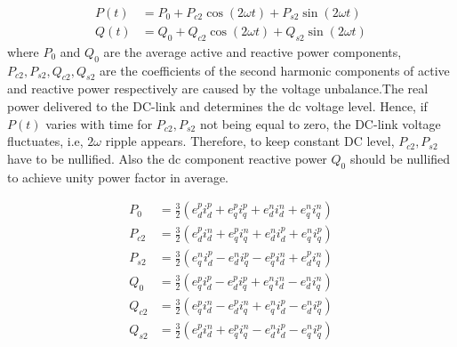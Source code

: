 \begin{equation}
    \begin{split}
        P(t) &= P_0 + P_{c2}\cos(2\omega t) + P_{s2}\sin(2\omega t) \\
        Q(t) &= Q_0 + Q_{c2}\cos(2\omega t) + Q_{s2}\sin(2\omega t)
    \end{split}
    \label{eq:instantaneous_power}
\end{equation}
where $P_0$ and $Q_0$ are the average active and reactive power components, $P_{c2}, P_{s2}, Q_{c2}, Q_{s2}$ are the coefficients of the
second harmonic components of active and reactive power respectively are caused by the voltage unbalance.The real power delivered to the
DC-link and determines the dc voltage level. Hence, if $P(t)$ varies with
time for $P_{c2}, P_{s2}$ not being equal to zero, the DC-link voltage fluctuates, i.e, $2\omega$ ripple appears. Therefore, to keep constant
DC level, $P_{c2}, P_{s2}$ have to be nullified. Also the dc component reactive power $Q_0$ should be nullified to achieve unity power
factor in average.\par
\begin{equation}
    \begin{split}
        P_0 &= \frac{3}{2}(e_{d}^{p} i_{d}^{p} + e_{q}^{p} i_{q}^{p} + e_{d}^{n} i_{d}^{n} + e_{q}^{n} i_{q}^{n}) \\
        P_{c2} &= \frac{3}{2}(e_{d}^{p} i_{d}^{n} + e_{q}^{p} i_{q}^{n} + e_{d}^{n} i_{d}^{p} + e_{q}^{n} i_{q}^{p}) \\
        P_{s2} &= \frac{3}{2}(e_{q}^{n} i_{d}^{p} - e_{d}^{n} i_{q}^{p} - e_{q}^{p} i_{d}^{n} + e_{d}^{p} i_{q}^{n}) \\
        Q_0 &= \frac{3}{2}(e_{q}^{p} i_{d}^{p} - e_{d}^{p} i_{q}^{p} + e_{q}^{n} i_{d}^{n} - e_{d}^{n} i_{q}^{n}) \\
        Q_{c2} &= \frac{3}{2}(e_{q}^{p} i_{d}^{n} - e_{d}^{p} i_{q}^{n} + e_{q}^{n} i_{d}^{p} - e_{d}^{n} i_{q}^{p}) \\
        Q_{s2} &= \frac{3}{2}(e_{d}^{p} i_{d}^{n} + e_{q}^{p} i_{q}^{n} - e_{d}^{n} i_{d}^{p} - e_{q}^{n} i_{q}^{p})
    \end{split}
    \label{eq:power_coefficients}
\end{equation}
